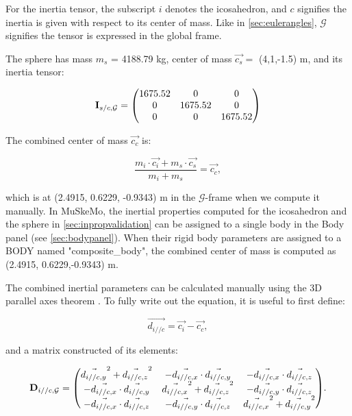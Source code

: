 \documentclass{article}
\begin{document}
For the inertia tensor, the subscript \(i\) denotes the icosahedron, and \(c\) signifies the inertia is given with respect to its center of mass. Like in \ref{sec:eulerangles}, \(\mathcal{G}\) signifies the tensor is expressed in the global frame.

The sphere has mass \(m_{s}\) = 4188.79 \si{kg}, center of mass \(\vec{c_{s}} =\) (4,1,-1.5) \si{m}, and its inertia tensor:

\begin{equation}
    \mathbf{I}_{s/c,{\mathcal{G}}} = \mqty(
    1675.52 & 0 & 0 \\
    0 & 1675.52 & 0 \\
    0 & 0 & 1675.52
    )
\end{equation}

The combined center of mass \(\vec{c_{c}}\) is:

\begin{equation}
    \frac{m_{i} \cdot \vec{c_{i}} + m_{s} \cdot \vec{c_{s}}}{m_{i} + m_{s}} = \vec{c_{c}},
\end{equation}

which is at (2.4915, 0.6229, -0.9343) \si{m} in the \(\mathcal{G}\)-frame when we compute it manually. In MuSkeMo, the inertial properties computed for the icosahedron and the sphere in \ref{sec:inpropvalidation} can be assigned to a single body in the Body panel (see \ref{sec:bodypanel}). When their rigid body parameters are assigned to a BODY named "composite\_body", the combined center of mass is computed as (2.4915, 0.6229,-0.9343) \si{m}. 

The combined inertial parameters can be calculated manually using the 3D parallel axes theorem \cite{valleryAdvancedDynamics2019,ruinaMechanicsToolsetStatics2019}. To fully write out the equation, it is useful to first define:

\begin{equation}
\vec{d_{i//c}} = \vec{c_i} - \vec{c_c},
\end{equation}

and a matrix constructed of its elements:

\begin{equation}
    \mathbf{D}_{i//c,\mathcal{G}} = \mqty(
        \vec{d_{i//c, y}}^2 + \vec{d_{i//c, z}}^2& - \vec{d_{i//c, x}} \cdot \vec{d_{i//c, y}} & - \vec{d_{i//c, x}} \cdot \vec{d_{i//c, z}} \\
        - \vec{d_{i//c, x}} \cdot \vec{d_{i//c, y}} &\vec{d_{i//c, x}}^2 + \vec{d_{i//c, z}}^2& - \vec{d_{i//c, y}} \cdot \vec{d_{i//c, z}}  \\
        - \vec{d_{i//c, x}} \cdot \vec{d_{i//c, z}}  & - \vec{d_{i//c, y}} \cdot \vec{d_{i//c, z}}  & \vec{d_{i//c, x}}^2 + \vec{d_{i//c, y}}^2
    ).
\end{equation}
\end{document}
